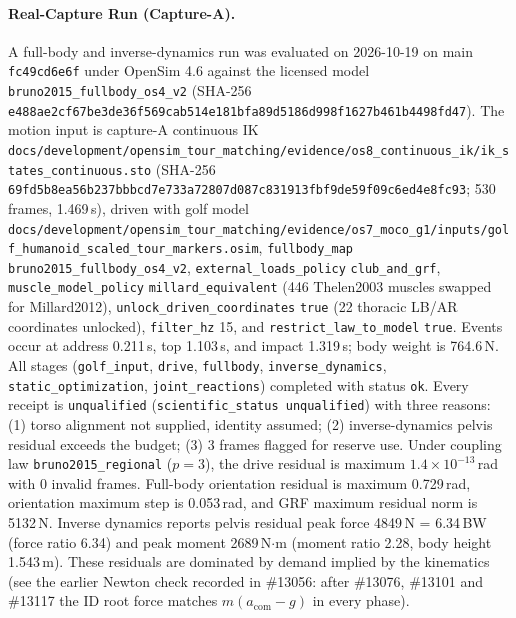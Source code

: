 \paragraph{Real-Capture Run (Capture-A).}
A full-body and inverse-dynamics run was evaluated on 2026-10-19 on main
\texttt{fc49cd6e6f} under OpenSim 4.6 against the licensed model
\texttt{bruno2015\_fullbody\_os4\_v2} (SHA-256
\texttt{e488ae2cf67be3de36f569cab514e181bfa89d5186d998f1627b461b4498fd47}).
The motion input is capture-A continuous IK
\texttt{docs/development/opensim\_tour\_matching/evidence/os8\_continuous\_ik/ik\_states\_continuous.sto}
(SHA-256
\texttt{69fd5b8ea56b237bbbcd7e733a72807d087c831913fbf9de59f09c6ed4e8fc93};
530 frames, 1.469\,s), driven with golf model
\texttt{docs/development/opensim\_tour\_matching/evidence/os7\_moco\_g1/inputs/golf\_humanoid\_scaled\_tour\_markers.osim},
\texttt{fullbody\_map} \texttt{bruno2015\_fullbody\_os4\_v2},
\texttt{external\_loads\_policy} \texttt{club\_and\_grf},
\texttt{muscle\_model\_policy} \texttt{millard\_equivalent} (446 Thelen2003
muscles swapped for Millard2012), \texttt{unlock\_driven\_coordinates}
\texttt{true} (22 thoracic LB/AR coordinates unlocked), \texttt{filter\_hz} 15,
and \texttt{restrict\_law\_to\_model} \texttt{true}. Events occur at address
0.211\,s, top 1.103\,s, and impact 1.319\,s; body weight is 764.6\,N.
All stages (\texttt{golf\_input}, \texttt{drive}, \texttt{fullbody},
\texttt{inverse\_dynamics}, \texttt{static\_optimization},
\texttt{joint\_reactions}) completed with status \texttt{ok}. Every receipt is
\texttt{unqualified} (\texttt{scientific\_status unqualified}) with three
reasons: (1) torso alignment not supplied, identity assumed; (2) inverse-dynamics
pelvis residual exceeds the budget; (3) 3 frames flagged for reserve use.
Under coupling law \texttt{bruno2015\_regional} ($p=3$), the drive residual
is maximum $1.4\times 10^{-13}$\,rad with 0 invalid frames. Full-body orientation
residual is maximum 0.729\,rad, orientation maximum step is 0.053\,rad, and GRF
maximum residual norm is 5132\,N. Inverse dynamics reports pelvis residual peak
force 4849\,N = 6.34\,BW (force ratio 6.34) and peak moment 2689\,N$\cdot$m
(moment ratio 2.28, body height 1.543\,m). These residuals are dominated by
demand implied by the kinematics (see the earlier Newton check recorded in
\#13056: after \#13076, \#13101 and \#13117 the ID root force matches
$m(a_{\mathrm{com}} - g)$ in every phase).

